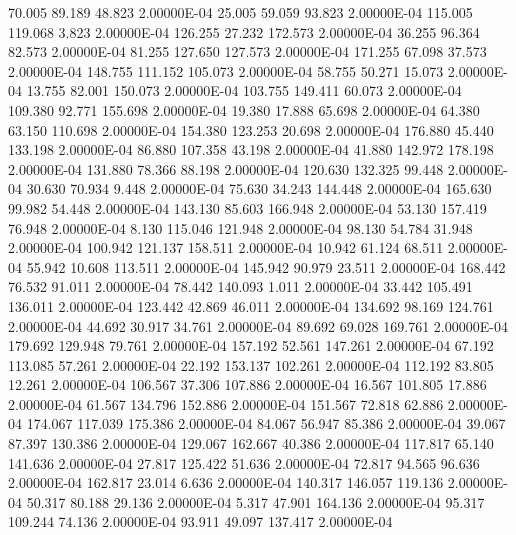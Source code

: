     70.005    89.189    48.823  2.00000E-04
    25.005    59.059    93.823  2.00000E-04
   115.005   119.068     3.823  2.00000E-04
   126.255    27.232   172.573  2.00000E-04
    36.255    96.364    82.573  2.00000E-04
    81.255   127.650   127.573  2.00000E-04
   171.255    67.098    37.573  2.00000E-04
   148.755   111.152   105.073  2.00000E-04
    58.755    50.271    15.073  2.00000E-04
    13.755    82.001   150.073  2.00000E-04
   103.755   149.411    60.073  2.00000E-04
   109.380    92.771   155.698  2.00000E-04
    19.380    17.888    65.698  2.00000E-04
    64.380    63.150   110.698  2.00000E-04
   154.380   123.253    20.698  2.00000E-04
   176.880    45.440   133.198  2.00000E-04
    86.880   107.358    43.198  2.00000E-04
    41.880   142.972   178.198  2.00000E-04
   131.880    78.366    88.198  2.00000E-04
   120.630   132.325    99.448  2.00000E-04
    30.630    70.934     9.448  2.00000E-04
    75.630    34.243   144.448  2.00000E-04
   165.630    99.982    54.448  2.00000E-04
   143.130    85.603   166.948  2.00000E-04
    53.130   157.419    76.948  2.00000E-04
     8.130   115.046   121.948  2.00000E-04
    98.130    54.784    31.948  2.00000E-04
   100.942   121.137   158.511  2.00000E-04
    10.942    61.124    68.511  2.00000E-04
    55.942    10.608   113.511  2.00000E-04
   145.942    90.979    23.511  2.00000E-04
   168.442    76.532    91.011  2.00000E-04
    78.442   140.093     1.011  2.00000E-04
    33.442   105.491   136.011  2.00000E-04
   123.442    42.869    46.011  2.00000E-04
   134.692    98.169   124.761  2.00000E-04
    44.692    30.917    34.761  2.00000E-04
    89.692    69.028   169.761  2.00000E-04
   179.692   129.948    79.761  2.00000E-04
   157.192    52.561   147.261  2.00000E-04
    67.192   113.085    57.261  2.00000E-04
    22.192   153.137   102.261  2.00000E-04
   112.192    83.805    12.261  2.00000E-04
   106.567    37.306   107.886  2.00000E-04
    16.567   101.805    17.886  2.00000E-04
    61.567   134.796   152.886  2.00000E-04
   151.567    72.818    62.886  2.00000E-04
   174.067   117.039   175.386  2.00000E-04
    84.067    56.947    85.386  2.00000E-04
    39.067    87.397   130.386  2.00000E-04
   129.067   162.667    40.386  2.00000E-04
   117.817    65.140   141.636  2.00000E-04
    27.817   125.422    51.636  2.00000E-04
    72.817    94.565    96.636  2.00000E-04
   162.817    23.014     6.636  2.00000E-04
   140.317   146.057   119.136  2.00000E-04
    50.317    80.188    29.136  2.00000E-04
     5.317    47.901   164.136  2.00000E-04
    95.317   109.244    74.136  2.00000E-04
    93.911    49.097   137.417  2.00000E-04
